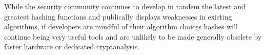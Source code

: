 \documentclass[a4paper,12pt]{article}
\begin{document}
While the security community continues to develop in tandem the latest and greatest hashing functions and publically displays weaknesses in existing algorithms, if developers are mindful of their algorithm choices hashes will continue being very useful tools and are unlikely to be made generally obselete by faster hardware or dedicated cryptanalysis.

\cleardoublepage



\newpage

\end{document}
